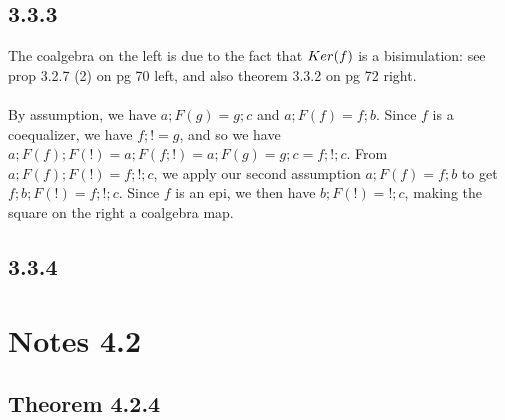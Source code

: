 \documentclass{article}
\begin{document}
\subsection*{3.3.3}

\begin{center}
\end{center}

The coalgebra on the left is due to the fact that $\mit{Ker}(f)$ is a bisimulation: see prop 3.2.7 (2) on pg 70 left,
and also theorem 3.3.2 on pg 72 right.\\~\\
By assumption, we have $a;F(g) = g;c$ and $a;F(f) = f;b$. Since $f$ is a coequalizer, we have $f;! = g$, and so
we have $a;F(f);F(!) = a;F(f;!) = a;F(g) = g;c = f;!;c$. From $a;F(f);F(!) = f;!;c$, we apply our second assumption
$a;F(f) = f;b$ to get $f;b;F(!) = f;!;c$. Since $f$ is an epi, we then have $b;F(!) = !;c$, making the square on
the right a coalgebra map.

\subsection*{3.3.4}

\section*{Notes 4.2}

\subsection*{Theorem 4.2.4}
\end{document}
